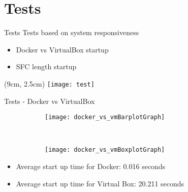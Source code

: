 \section{Tests}
\begin{frame}{Tests}
  Tests based on system responsiveness
  \begin{itemize}
    \item<1-> Docker vs VirtualBox startup
    \item<2-> SFC length startup 
  \end{itemize}

  \begin{textblock*}{5cm}(9cm, 2.5cm)
    \texttt{[image: test]}
  \end{textblock*}
\end{frame}

\begin{frame}{Tests - Docker vs VirtualBox}

  \begin{figure}
    \centering
    \begin{subfigure}[b]{0.45\textwidth}
      \texttt{[image: docker\_vs\_vmBarplotGraph]}
    \end{subfigure}
    ~
    \begin{subfigure}[b]{0.45\textwidth}
      \texttt{[image: docker\_vs\_vmBoxplotGraph]}
    \end{subfigure}
  \end{figure}
  \begin{itemize}
  \item Average start up time for Docker: 0.016 seconds
  \item Average start up time for Virtual Box: 20.211 seconds
  \end{itemize}
\end{frame}

